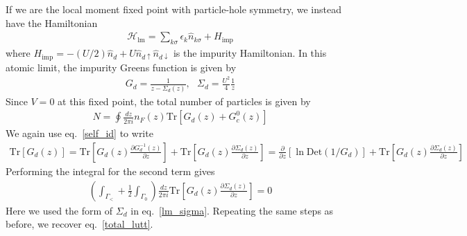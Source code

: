 \documentclass{report}
\numberwithin{equation}{section}
\begin{document}
If we are the local moment fixed point with particle-hole symmetry, we instead have the Hamiltonian
\begin{equation}\begin{aligned}
	\mathcal{H}_\text{lm} = \sum_{k\sigma}\epsilon_k \hat n_{k\sigma} + H_\text{imp}
\end{aligned}\end{equation}
where \(H_\text{imp} = -(U/2)\hat n_d + U\hat n_{d \uparrow} \hat n_{d \downarrow}\) is the impurity Hamiltonian. In this atomic limit, the impurity Greens function is given by~\cite{phillips2012advanced}
\begin{equation}\begin{aligned}
	\label{lm_sigma}
	G_d = \frac{1}{z - \Sigma_d(z)}, ~ ~ ~\Sigma_d = \frac{U^2}{4}\frac{1}{z}
\end{aligned}\end{equation}
Since \(V=0\) at this fixed point, the total number of particles is given by
\begin{equation}\begin{aligned}
	\label{total_num_lm}
	N = \oint \frac{dz}{2\pi i}n_F(z) \text{Tr}\left[G_{d}(z) + G_c^0(z)\right]
\end{aligned}\end{equation}
We again use eq.~\ref{self_id} to write
\begin{equation}\begin{aligned}
	\text{Tr}\left[G_{d}(z)\right] = \text{Tr}\left[ G_{d}(z)\frac{\partial{G_{d}^{-1}(z)}}{\partial{z}} \right] + \text{Tr}\left[ G_{d}(z)\frac{\partial{\Sigma_d(z)}}{\partial{z}} \right] = \frac{\partial{}}{\partial{z}}\left[\ln \text{Det}\left(1/G_{d}\right)\right] + \text{Tr}\left[ G_{d}(z)\frac{\partial{\Sigma_d(z)}}{\partial{z}} \right]
\end{aligned}\end{equation}
Performing the integral for the second term gives
\begin{equation}\begin{aligned}
	\left(\int_{\Gamma_<} + \frac{1}{2}\int_{\Gamma_0}\right)\frac{dz}{2\pi i}\text{Tr}\left[ G_{d}(z)\frac{\partial{\Sigma_d(z)}}{\partial{z}} \right] = 0
\end{aligned}\end{equation}
Here we used the form of \(\Sigma_d\) in eq.~\ref{lm_sigma}. Repeating the same steps as before, we recover eq.~\ref{total_lutt}.
\end{document}
